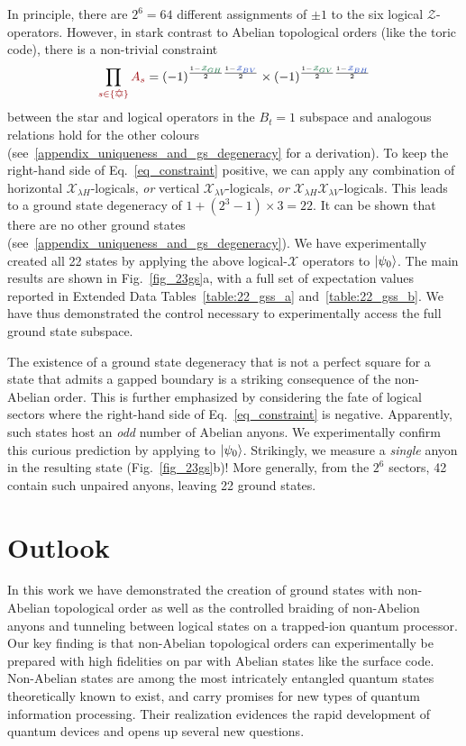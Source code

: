 \documentclass[nofootinbib,pra,twocolumn,showpacs,superscriptaddress,notitlepage,amsmath]{revtex4-2} %
\begin{document}
In principle, there are $2^6 = 64$ different assignments of $\pm 1$ to the six logical $\mathcal{Z}$-operators. However, in stark contrast to Abelian topological orders (like the toric code), there is a non-trivial constraint 
\begin{equation}
    \prod_{\red{s \in \{\davidsstar\}}}
    \red{A_s} = (-1)^{\frac{1-\green{\mathcal{Z}_{GH}}}{2}\frac{1-\blue{\mathcal{Z}_{BV}}}{2}} \times (-1)^{\frac{1-\green{\mathcal{Z}_{GV}}}{2}\frac{1-\blue{\mathcal{Z}_{BH}}}{2}}
    \label{eq_constraint}
\end{equation}
between the star and logical operators in the $B_t = 1$ subspace and analogous relations hold for the other colours (see~\ref{appendix_uniqueness_and_gs_degeneracy} for a derivation). To keep the right-hand side of Eq.~\eqref{eq_constraint} positive, we can apply any combination of horizontal $\mathcal{X}_{\lambda H}$-logicals, \emph{or} vertical $\mathcal{X}_{\lambda V}$-logicals, \emph{or} $\mathcal{X}_{\lambda H}\mathcal{X}_{\lambda V}$-logicals. This leads to a ground state degeneracy of $1+(2^3-1)\times 3=22$. It can be shown that there are no other ground states (see~\ref{appendix_uniqueness_and_gs_degeneracy}). We have experimentally created all 22 states by applying the above logical-$\mathcal X$ operators to $\ket{\psi_0}$. The main results are shown in Fig.~\ref{fig_23gs}a, with a full set of expectation values reported in Extended Data Tables~\ref{table:22_gss_a} and~\ref{table:22_gss_b}. We have thus demonstrated the control necessary to experimentally access the full ground state subspace.

The existence of a ground state degeneracy that is not a perfect square for a state that admits a gapped boundary is a striking consequence of the non-Abelian order. This is further emphasized by considering the fate of logical sectors where the right-hand side of Eq.~\eqref{eq_constraint} is negative. Apparently, such states host an \emph{odd} number of Abelian anyons. We experimentally confirm this curious prediction by applying  to $\ket{\psi_0}$. Strikingly, we measure a \emph{single} anyon  in the resulting state (Fig.~\ref{fig_23gs}b)! More generally, from the $2^6$ sectors, 42 contain such unpaired anyons, leaving 22 ground states.

\section{Outlook}
In this work we have demonstrated the creation of ground states with non-Abelian topological order as well as the controlled braiding of non-Abelion anyons and tunneling between logical states on a trapped-ion quantum processor. Our key finding is that non-Abelian topological orders can experimentally be prepared with high fidelities on par with Abelian states like the surface code. Non-Abelian states are among the most intricately entangled quantum states theoretically known to exist, and carry promises for new types of quantum information processing. Their realization evidences the rapid development of quantum devices and opens up several new questions.
\end{document}
